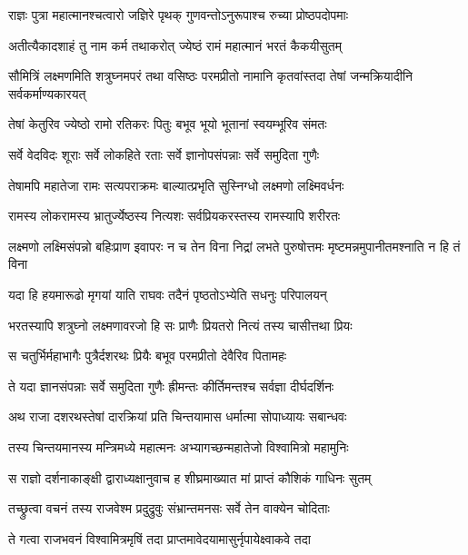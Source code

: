 \twolineshloka
{राज्ञः पुत्रा महात्मानश्चत्वारो जज्ञिरे पृथक्}
{गुणवन्तोऽनुरूपाश्च रुच्या प्रोष्ठपदोपमाः} %

\twolineshloka
{अतीत्यैकादशाहं तु नाम कर्म तथाकरोत्}
{ज्येष्ठं रामं महात्मानं भरतं कैकयीसुतम्} %

\threelineshloka
{सौमित्रिं लक्ष्मणमिति शत्रुघ्नमपरं तथा}
{वसिष्ठः परमप्रीतो नामानि कृतवांस्तदा}
{तेषां जन्मक्रियादीनि सर्वकर्माण्यकारयत्} %

\twolineshloka
{तेषां केतुरिव ज्येष्ठो रामो रतिकरः पितुः}
{बभूव भूयो भूतानां स्वयम्भूरिव संमतः} %

\twolineshloka
{सर्वे वेदविदः शूराः सर्वे लोकहिते रताः}
{सर्वे ज्ञानोपसंपन्नाः सर्वे समुदिता गुणैः} %

\twolineshloka
{तेषामपि महातेजा रामः सत्यपराक्रमः}
{बाल्यात्प्रभृति सुस्निग्धो लक्ष्मणो लक्ष्मिवर्धनः} %

\twolineshloka
{रामस्य लोकरामस्य भ्रातुर्ज्येष्ठस्य नित्यशः}
{सर्वप्रियकरस्तस्य रामस्यापि शरीरतः} %

\threelineshloka
{लक्ष्मणो लक्ष्मिसंपन्नो बहिःप्राण इवापरः}
{न च तेन विना निद्रां लभते पुरुषोत्तमः}
{मृष्टमन्नमुपानीतमश्नाति न हि तं विना} %

\twolineshloka
{यदा हि हयमारूढो मृगयां याति राघवः}
{तदैनं पृष्ठतोऽभ्येति सधनुः परिपालयन्} %

\twolineshloka
{भरतस्यापि शत्रुघ्नो लक्ष्मणावरजो हि सः}
{प्राणैः प्रियतरो नित्यं तस्य चासीत्तथा प्रियः} %

\twolineshloka
{स चतुर्भिर्महाभागैः पुत्रैर्दशरथः प्रियैः}
{बभूव परमप्रीतो देवैरिव पितामहः} %

\twolineshloka
{ते यदा ज्ञानसंपन्नाः सर्वे समुदिता गुणैः}
{ह्रीमन्तः कीर्तिमन्तश्च सर्वज्ञा दीर्घदर्शिनः} %

\twolineshloka
{अथ राजा दशरथस्तेषां दारक्रियां प्रति}
{चिन्तयामास धर्मात्मा सोपाध्यायः सबान्धवः} %

\twolineshloka
{तस्य चिन्तयमानस्य मन्त्रिमध्ये महात्मनः}
{अभ्यागच्छन्महातेजो विश्वामित्रो महामुनिः} %

\twolineshloka
{स राज्ञो दर्शनाकाङ्क्षी द्वाराध्यक्षानुवाच ह}
{शीघ्रमाख्यात मां प्राप्तं कौशिकं गाधिनः सुतम्} %

\twolineshloka
{तच्छ्रुत्वा वचनं तस्य राजवेश्म प्रदुद्रुवुः}
{संभ्रान्तमनसः सर्वे तेन वाक्येन चोदिताः} %

\twolineshloka
{ते गत्वा राजभवनं विश्वामित्रमृषिं तदा}
{प्राप्तमावेदयामासुर्नृपायेक्ष्वाकवे तदा} %

